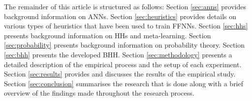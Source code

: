 The remainder of this article is structured as follows: Section \ref{sec:anns} provides background information on \acp{ANN}. Section \ref{sec:heuristics} provides details on various types of heuristics that have been used to train \acp{FFNN}. Section \ref{sec:hhs} presents background information on \acp{HH} and meta-learning. Section \ref{sec:probability} presents background information on probability theory. Section \ref{sec:bhh} presents the developed \acs{BHH}. Section \ref{sec:methodology} presents a detailed description of the empirical process and the setup of each experiment. Section \ref{sec:results} provides and discusses the results of the empirical study. Section \ref{sec:conclusion} summarises the research that is done along with a brief overview of the findings made throughout the research process.

